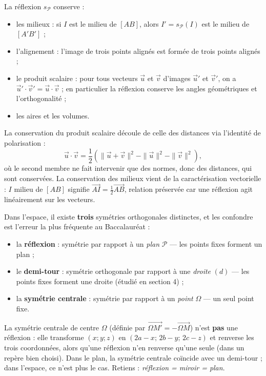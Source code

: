 \documentclass[11pt]{article}
\newcommand{\cle}[1]{{\popxbold\color{popdark}#1}}
\begin{document}
\begin{propriete}
La réflexion $s_{\mathcal{P}}$ conserve :
\begin{itemize}
\item les \cle{milieux} : si $I$ est le milieu de $[AB]$, alors $I' = s_{\mathcal{P}}(I)$ est le milieu de $[A'B']$ ;
\item l'\cle{alignement} : l'image de trois points alignés est formée de trois points alignés ;
\item le \cle{produit scalaire} : pour tous vecteurs $\vec{u}$ et $\vec{v}$ d'images $\vec{u}'$ et $\vec{v}'$, on a $\vec{u}' \cdot \vec{v}' = \vec{u} \cdot \vec{v}$ ; en particulier la réflexion conserve les \cle{angles géométriques} et l'\cle{orthogonalité} ;
\item les \cle{aires} et les \cle{volumes}.
\end{itemize}
\end{propriete}

La conservation du produit scalaire découle de celle des distances via l'identité de polarisation :
\[ \vec{u} \cdot \vec{v} = \frac{1}{2}\left(\|\vec{u} + \vec{v}\|^2 - \|\vec{u}\|^2 - \|\vec{v}\|^2\right), \]
où le second membre ne fait intervenir que des normes, donc des distances, qui sont conservées. La conservation des milieux vient de la caractérisation vectorielle : $I$ milieu de $[AB]$ signifie $\overrightarrow{AI} = \frac{1}{2}\overrightarrow{AB}$, relation préservée car une réflexion agit linéairement sur les vecteurs.

\begin{attention}
Dans l'espace, il existe \textbf{trois} symétries orthogonales distinctes, et les confondre est l'erreur la plus fréquente au Baccalauréat :
\begin{itemize}
\item la \textbf{réflexion} : symétrie par rapport à un \emph{plan} $\mathcal{P}$ — les points fixes forment un plan ;
\item le \textbf{demi-tour} : symétrie orthogonale par rapport à une \emph{droite} $(d)$ — les points fixes forment une droite (étudié en section 4) ;
\item la \textbf{symétrie centrale} : symétrie par rapport à un \emph{point} $\Omega$ — un seul point fixe.
\end{itemize}
La symétrie centrale de centre $\Omega$ (définie par $\overrightarrow{\Omega M'} = -\overrightarrow{\Omega M}$) n'est \textbf{pas} une réflexion : elle transforme $(x;y;z)$ en $(2a-x;\, 2b-y;\, 2c-z)$ et renverse les trois coordonnées, alors qu'une réflexion n'en renverse qu'une seule (dans un repère bien choisi). Dans le plan, la symétrie centrale coïncide avec un demi-tour ; dans l'espace, ce n'est plus le cas. Retiens : \emph{réflexion = miroir = plan}.
\end{attention}
\end{document}
